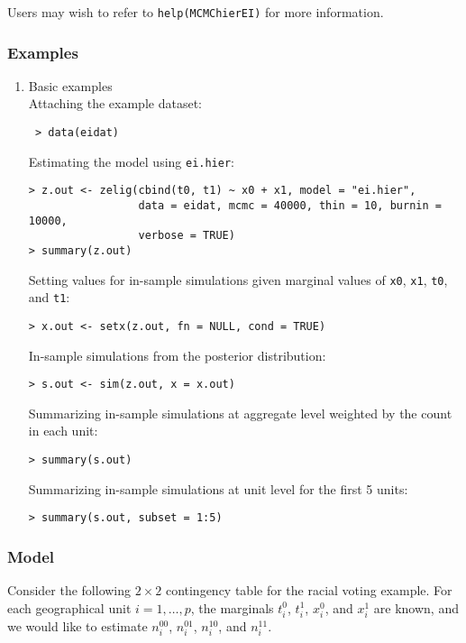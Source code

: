 \noindent Users may wish to refer to \texttt{help(MCMChierEI)} for more information.



\subsubsection{Examples}

\begin{enumerate}
 \item Basic examples \\
 Attaching the example dataset:
 \begin{verbatim} 
 > data(eidat)
 \end{verbatim}
Estimating the model using \texttt{ei.hier}:
\begin{verbatim}
> z.out <- zelig(cbind(t0, t1) ~ x0 + x1, model = "ei.hier", 
                 data = eidat, mcmc = 40000, thin = 10, burnin = 10000, 
                 verbose = TRUE)
> summary(z.out)
\end{verbatim}

Setting values for in-sample simulations given marginal values 
of {\tt x0}, {\tt x1}, {\tt t0}, and {\tt t1}:
\begin{verbatim}
> x.out <- setx(z.out, fn = NULL, cond = TRUE)
\end{verbatim}

In-sample simulations from the posterior distribution:
\begin{verbatim}
> s.out <- sim(z.out, x = x.out)
\end{verbatim}

Summarizing in-sample simulations at aggregate level 
weighted by the count in each unit:
\begin{verbatim}
> summary(s.out)
\end{verbatim}

Summarizing in-sample simulations at unit level for the first 5 units:
\begin{verbatim}
> summary(s.out, subset = 1:5)
\end{verbatim}

\end{enumerate}
\clearpage
\subsubsection{Model}
Consider the following $2 \times 2$ contingency table for the racial
voting example.  For each geographical unit $i = 1, \dots, p$, the
marginals $t_i^0$, $t_i^1$, $x_i^0$, and $x_i^1$ are known, and we
would like to estimate $n_i^{00}$, $n_i^{01}$, $n_i^{10}$, and $n_i^{11}$.

